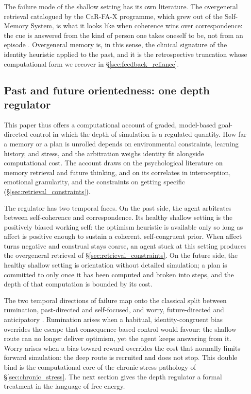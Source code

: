 \documentclass[11pt,a4paper]{article}
\begin{document}
The failure mode of the shallow setting has its own literature. The overgeneral retrieval catalogued by the CaR-FA-X programme, which grew out of the Self-Memory System, is what it looks like when coherence wins over correspondence: the cue is answered from the kind of person one takes oneself to be, not from an episode \citep{williamsetal2007, watkinsteasdale2001}. Overgeneral memory is, in this sense, the clinical signature of the identity heuristic applied to the past, and it is the retrospective truncation whose computational form we recover in \S\ref{sec:feedback_reliance}.

\subsection{Past and future orientedness: one depth regulator}\label{sec:one_regulator}
This paper thus offers a computational account of graded, model-based goal-directed control in which the depth of simulation is a regulated quantity. How far a memory or a plan is unrolled depends on environmental constraints, learning history, and stress, and the arbitration weighs identity fit alongside computational cost. The account draws on the psychological literature on memory retrieval and future thinking, and on its correlates in interoception, emotional granularity, and the constraints on getting specific (\S\ref{sec:retrieval_constraints}).

The regulator has two temporal faces. On the past side, the agent arbitrates between self-coherence and correspondence. Its healthy shallow setting is the positively biased working self: the optimism heuristic is available only so long as affect is positive enough to sustain a coherent, self-congruent prior. When affect turns negative and construal stays coarse, an agent stuck at this setting produces the overgeneral retrieval of \S\ref{sec:retrieval_constraints}. On the future side, the healthy shallow setting is orientation without detailed simulation; a plan is committed to only once it has been computed and broken into steps, and the depth of that computation is bounded by its cost.

The two temporal directions of failure map onto the classical split between rumination, past-directed and self-focused, and worry, future-directed and anticipatory \citep{fresco2002, nolenhoeksema2008}. Rumination arises when a habitual, identity-congruent bias overrides the escape that consequence-based control would favour: the shallow route can no longer deliver optimism, yet the agent keeps answering from it. Worry arises when a bias toward reward overrides the cost that normally limits forward simulation: the deep route is recruited and does not stop. This double bind is the computational core of the chronic-stress pathology of \S\ref{sec:chronic_stress}. The next section gives the depth regulator a formal treatment in the language of free energy.
\end{document}
